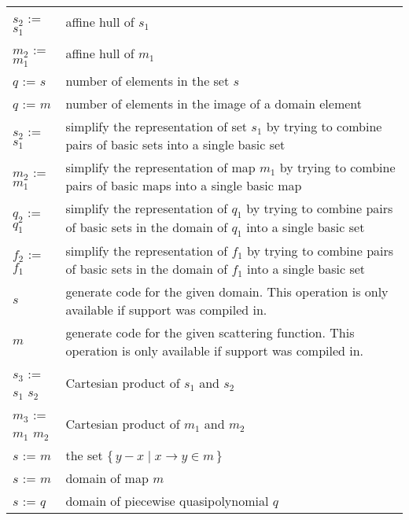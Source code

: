 \label{t:iscc}
\tablelasttail{}
\begin{supertabular}{lp{0.7\textwidth}}
$s_2$ :=  $s_1$ & affine hull of $s_1$
\\
$m_2$ :=  $m_1$ & affine hull of $m_1$
\\
$q$ :=  $s$ &
number of elements in the set $s$
\\
$q$ :=  $m$ &
number of elements in the image of a domain element
\\
$s_2$ :=  $s_1$ &
simplify the representation of set $s_1$ by trying
to combine pairs of basic sets into a single
basic set
\\
$m_2$ :=  $m_1$ &
simplify the representation of map $m_1$ by trying
to combine pairs of basic maps into a single
basic map
\\
$q_2$ :=  $q_1$ &
simplify the representation of $q_1$ by trying
to combine pairs of basic sets in the domain
of $q_1$ into a single basic set
\\
$f_2$ :=  $f_1$ &
simplify the representation of $f_1$ by trying
to combine pairs of basic sets in the domain
of $f_1$ into a single basic set
\\
 $s$ &
generate code for the given domain.
This operation is only available if 
support was compiled in.
\\
 $m$ &
generate code for the given scattering function.
This operation is only available if 
support was compiled in.
\\
$s_3$ := $s_1$  $s_2$ &
Cartesian product of $s_1$ and $s_2$
\\
$m_3$ := $m_1$  $m_2$ &
Cartesian product of $m_1$ and $m_2$
\\
$s$ :=  $m$ &
the set $\{\, y - x \mid x \to y \in m \,\}$
\\
$s$ :=  $m$ &
domain of map $m$
\\
$s$ :=  $q$ &
domain of piecewise quasipolynomial $q$

\end{supertabular}
